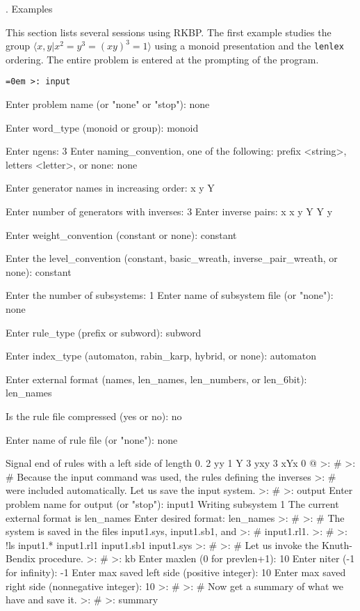 \bigskip
{}. Examples

\nobreak

This section lists several sessions using RKBP.  The first example
studies the group $\langle x,y|x^2 = y^3 = (xy)^3 = 1 \rangle$ using a
monoid presentation and the {\tt lenlex} ordering.  The entire problem
is entered at the prompting of the program.

\bigskip
{\tt \obeylines\obeyspaces \parindent=0em \parskip=0in \ttspace
>: input

Enter problem name (or "none" or "stop"):  none

Enter word\_type (monoid or group):  monoid

Enter ngens:  3
Enter naming\_convention, one of the following:
prefix <string>, letters <letter>, or none:  none

Enter generator names in increasing order:
x
y
Y

Enter number of generators with inverses:  3
Enter inverse pairs:
x x
y Y
Y y

Enter weight\_convention (constant or none):  constant

Enter the level\_convention
(constant, basic\_wreath, inverse\_pair\_wreath, or none):  constant

Enter the number of subsystems:  1
Enter name of subsystem file (or "none"):  none

Enter rule\_type (prefix or subword):  subword

Enter index\_type (automaton, rabin\_karp, hybrid, or none):  automaton

Enter external format
(names, len\_names, len\_numbers, or len\_6bit):  len\_names

Is the rule file compressed (yes or no):  no

Enter name of rule file (or "none"):  none

Signal end of rules with a left side of length 0.
2 yy 1 Y
3 yxy 3 xYx
0 @ 
>: \#
>: \# Because the input command was used, the rules defining the inverses
>: \# were included automatically.  Let us save the input system.
>: \#
>: output
Enter problem name for output (or "stop"):  input1
Writing subsystem 1
The current external format is len\_names
Enter desired format:  len\_names
>: \#
>: \# The system is saved in the files input1.sys, input1.sb1, and
>: \# input1.rl1.
>: \#
>: !ls input1.*
input1.rl1
input1.sb1
input1.sys
>: \#
>: \# Let us invoke the Knuth-Bendix procedure.
>: \#
>: kb
Enter maxlen (0 for prevlen+1):  10
Enter niter (-1 for infinity):  -1
Enter max saved left side (positive integer):  10
Enter max saved right side (nonnegative integer):  10
>: \#
>: \# Now get a summary of what we have and save it.
>: \#
>: summary

}
